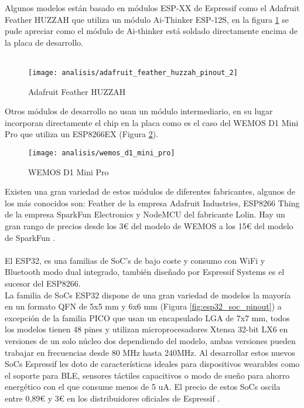\documentclass[../proyecto.tex]{subfiles}
\begin{document}
Algunos modelos están basado en módulos ESP-XX de Espressif como el Adafruit Feather HUZZAH \cite{adafruit_feather_huzzah} que utiliza un módulo Ai-Thinker ESP-12S, en la figura \ref{fig:adafruit_feather_huzzah_pinout_2} se pude apreciar como el módulo de Ai-thinker está soldado directamente encima de la placa de desarrollo.\\~\\

\begin{figure}[H]
\centering
\texttt{[image: analisis/adafruit\_feather\_huzzah\_pinout\_2]}
\caption{Adafruit Feather HUZZAH}
\label{fig:adafruit_feather_huzzah_pinout_2}
\end{figure}

Otros módulos de desarrollo no usan un módulo intermediario, en su lugar incorporan directamente el chip en la placa como es el caso del WEMOS D1 Mini Pro \cite{wemos_d1_mini_pro} que utiliza un ESP8266EX (Figura \ref{fig:wemos_d1_mini_pro}).\\

\begin{figure}[h]
\centering
\texttt{[image: analisis/wemos\_d1\_mini\_pro]}
\caption{WEMOS D1 Mini Pro}
\label{fig:wemos_d1_mini_pro}
\end{figure}

Existen una gran variedad de estos módulos de diferentes fabricantes, algunos de los más conocidos son:  Feather de la empresa Adafruit Industries, ESP8266 Thing de la empresa SparkFun Electronics y NodeMCU del fabricante Lolin. Hay un gran rango de precios desde los 3€ del modelo de WEMOS a los 15€ del modelo de SparkFun \cite{espressif_provider_digikey} \cite{espressif_provider_mouser}\cite{sparkfun_thing_official_page}.\\


\\
El ESP32, es una familias de SoC's de bajo coste y consumo con WiFi y Bluetooth modo dual integrado, también diseñado por Espressif Systems \cite{esp32_overview} es el sucesor del ESP8266.\\

La familia de SoCs ESP32 dispone de una gran variedad de modelos la mayoría en un formato QFN de 5x5 mm y 6x6 mm (Figura \ref{fig:esp32_soc_pinout}) a excepción de la familia PICO que usan un encapsulado LGA de 7x7 mm, todos los modelos tienen 48 pines y utilizan microprocesadores Xtensa 32-bit LX6 en versiones de un solo núcleo dos dependiendo del modelo, ambas versiones pueden trabajar en frecuencias desde 80 MHz hasta 240MHz. Al desarrollar estos nuevos SoCs Espressif les doto de características ideales para dispositivos wearables como el soporte para BLE, sensores táctiles capacitivos o modo de sueño para ahorro energético con el que consume menos de 5  uA. El precio de estos SoCs oscila entre 0,89€ y 3€ en los distribuidores oficiales de Espressif \cite{espressif_provider_digikey} \cite{espressif_provider_mouser}.\\
\end{document}
